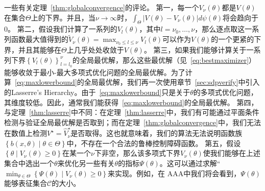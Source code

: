 一些有关定理~\ref{thm:globalconvergence}的评论。
第一，每一个$V_\nu(\theta)$都是$V(\theta)$在集合$\Theta$上的下界。并且，当$\nu \rightarrow \infty$时，$\int_\Theta |V(\theta) - V_\nu(\theta)| d\psi(\theta)$将会趋向于0。
第二，假设我们计算了一系列的$V_l(\theta)$，其中$l = \nu_0, \dots, \nu$，那么逐点取这一系列函数最大值得到的$\tilde{V}_\nu(\theta) = \max_{\nu_0 \le l \le \nu}V_l(\theta)$可以作为$V(\theta)$的一个更紧的下界，并且其能够在$\Theta$上几乎处处收敛于$V(\theta)$。
第三，如果我们能够计算关于一系列下界$\left\{ V_l(\theta) \right\}_{l=l_0}^\nu$的全局最优解，那么这些最优解（见~\eqref{eq:bestmaximizer}）能够收敛于最小-最大多项式优化问题的全局最优解。为了计算~\eqref{eq:maxlowerbound}的全局最优解，我们再一次使用章节~\ref{sec:sdpverify}中引入的Lasserre's Hierarchy。由于~\eqref{eq:maxlowerbound}只是关于$\theta$的多项式优化问题，其维度较低。因此，通常我们能获得~\eqref{eq:maxlowerbound}的全局最优解。
第四，与定理~\ref{thm:lasserre}中不同：在定理~\ref{thm:lasserre}中，我们有可能通过平面条件检测与验证全局最优解是否取到；而在定理~\ref{thm:globalconvergence}中，我们无法在数值上检测$V^\star = \hat{V}_\nu^\star$是否取得。这也就意味着，我们的算法无法说明函数族$\left\{ b(x, \theta) \mid \theta \in \Theta \right\}$中，不存在一个合法的鲁棒控制障碍函数。
第五，假设$\left\{ \theta \mid V_\nu(\theta) \ge 0 \right\}$在某一个$\nu$下非空，那么该多项式下界$V_\nu(\theta)$使我们能够在上述集合中选出一个$\theta$来优化另一些有关$\theta$的指标$\Psi(\theta)$。这可以通过求解“$\min_{\theta \in \Theta} \left\{ \Psi(\theta) \mid V_\nu(\theta) \ge 0 \right\}$来实现。例如，在{\color{red} AAA}中我们将会看到，$\Psi(\theta)$能够表征集合$\mathcal{C}$的大小。